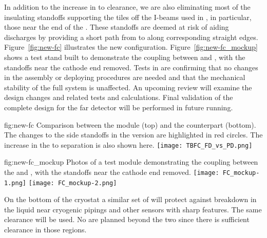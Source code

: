 In addition to the increase in  to  clearance, we are also eliminating most of the insulating standoffs supporting the  tiles off the  I-beams used in , in particular, those near the  end of the .  These standoffs  are deemed at risk of aiding discharges by providing a short path from  to  along corresponding straight edges.  Figure~\ref{fig:new-fc} illustrates the new configuration. Figure~\ref{fig:new-fc_mockup} shows a test stand built to demonstrate the coupling between  and , with the standoffs near the cathode end removed. Tests in  are confirming that no changes in the assembly or deploying procedures are needed and that the mechanical stability of the full system is unaffected. An upcoming review will examine the design changes and related tests and calculations. Final validation of the complete  design for the far detector will be performed in future  running.

\begin{dunefigure}
{fig:new-fc}
{Comparison between the   module (top) and the  counterpart (bottom).  The changes to the  side standoffs in the  version are highlighted in red circles.  The increase in the  to  separation is also shown here.} %
\texttt{[image: TBFC\_FD\_vs\_PD.png]}
\end{dunefigure}

\begin{dunefigure}
{fig:new-fc_mockup}
{Photos of a test module demonstrating the coupling between the   and , with the standoffs near the cathode end removed.} %
\texttt{[image: FC\_mockup-1.png]}
\texttt{[image: FC\_mockup-2.png]}
\end{dunefigure}

On the bottom of the cryostat a similar set of  %
will protect against %
breakdown in the liquid near cryogenic pipings and other sensors with sharp features. The same clearance will be used. No  are planned beyond the two  since there is sufficient clearance in those regions.  

